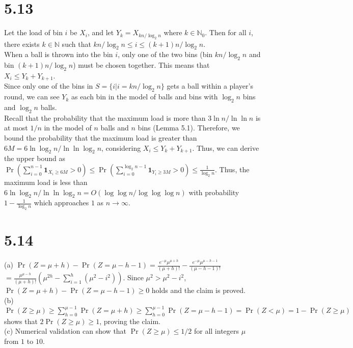 \documentclass{article}
\begin{document}
\section*{5.13}
Let the load of bin $i$ be $X_i$, and let $Y_k=X_{kn/\log_2n}$ where $k\in\mathbb{N}_0$.
Then for all $i$, there exists $k\in \mathbb{N}$ such that $kn/\log_2 n \leq i \leq (k+1)n/\log_2 n$.\\
When a ball is thrown into the bin $i$, only one of the two bins (bin $kn/\log_2 n$ and bin $(k+1)n/\log_2 n$) must be chosen together. This means that $X_i \leq Y_k+Y_{k+1}$.\\
Since only one of the bins in $S=\{i|i=kn/\log_2 n\}$ gets a ball within a player's round, we can see $Y_k$ as each bin in the model of balls and bins with $\log_2 n$ bins and $\log_2 n$ balls.\\
Recall that the probability that the maximum load is more than $3\ln n/\ln\ln n$ is at most $1/n$ in the model of $n$ balls and $n$ bins (Lemma 5.1).
Therefore, we bound the probability that the maximum load is greater than $6M=6\ln \log_2 n / \ln\ln \log_2 n$, considering $X_i \leq Y_k + Y_{k+1}$.
Thus, we can derive the upper bound as $\Pr(\sum\limits_{i=0}^{n-1}\textbf{1}_{X_i\geq6M}>0)\leq\Pr(\sum\limits_{i=0}^{\log_2 n-1}\textbf{1}_{Y_i\geq 3M}>0)\leq \frac{1}{\log_2 n}$.
Thus, the maximum load is less than $6\ln \log_2 n / \ln\ln \log_2 n = O(\log\log n/\log\log\log n)$ with probability $1-\frac{1}{\log_2 n}$ which approaches $1$ as $n\rightarrow \infty$.
\section*{5.14}
(a) $\Pr(Z=\mu+h)-\Pr(Z=\mu-h-1)=\frac{e^{-\mu}\mu^{\mu+h}}{(\mu+h)!}-\frac{e^{-\mu}\mu^{\mu-h-1}}{(\mu-h-1)!}$
$=\frac{\mu^{\mu-h}}{(\mu+h)!}(\mu^{2h}-\sum\limits_{i=1}^h(\mu^2-i^2))$.
Since $\mu^2 > \mu^2 - i^2$, $\Pr(Z=\mu+h)-\Pr(Z=\mu-h-1)\geq 0$ holds and the claim is proved.\\
(b) $\Pr(Z\geq \mu)\geq \sum\limits_{h=0}^{\mu-1}\Pr(Z=\mu+h)\geq\sum\limits_{h=0}^{\mu-1}\Pr(Z=\mu-h-1)=\Pr(Z<\mu)=1-\Pr(Z\geq\mu)$
shows that $2\Pr(Z\geq\mu)\geq1$, proving the claim.\\
(c) Numerical validation can show that $\Pr(Z\geq \mu)\leq 1/2$ for all integers $\mu$ from $1$ to $10$.
\end{document}
